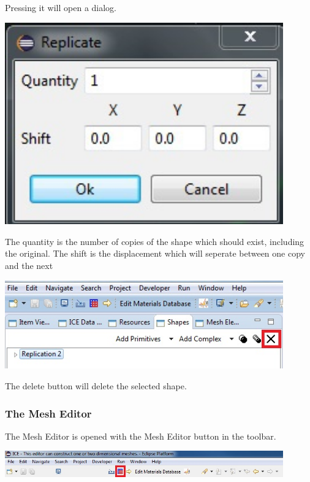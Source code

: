 \documentclass{article}
\begin{document}
Pressing it will open a dialog.

\begin{center}
\includegraphics[width=12cm]{images/ReplicateDialog}
\end{center}

The quantity is the number of copies of the shape which should exist, including
the original. The shift is the displacement which will seperate between one
copy and the next

\begin{center}
\includegraphics[width=12cm]{images/DeleteButton}
\end{center}

The delete button will delete the selected shape.

\subsubsection{The Mesh Editor}

The Mesh Editor is opened with the Mesh Editor button in the toolbar.

\begin{center}
\includegraphics[width=12cm]{images/MeshEditorButton}
\end{center}
\end{document}
